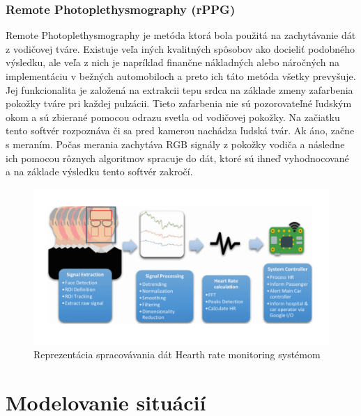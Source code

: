 \documentclass[10pt,oneside,slovak,a4paper]{article}
\begin{document}
\subsubsection{Remote Photoplethysmography (rPPG)} \label{predstavenie:heathr:rppg}
Remote Photoplethysmography je metóda ktorá bola použitá na zachytávanie dát z vodičovej tváre. Existuje veľa iných kvalitných spôsobov ako docieliť podobného výsledku, ale veľa z nich je napríklad finančne nákladných alebo náročných na implementáciu v bežných automobiloch a preto ich táto metóda všetky prevyšuje. Jej funkcionalita je založená na extrakcii tepu srdca na základe zmeny zafarbenia pokožky tváre pri každej pulzácii.\cite{hearth} Tieto zafarbenia nie sú pozorovateľné ľudským okom a sú zbierané pomocou odrazu svetla od vodičovej pokožky. Na začiatku tento softvér rozpoznáva či sa pred kamerou nachádza ľudská tvár. Ak áno, začne s meraním. Počas merania zachytáva RGB signály z pokožky vodiča a následne ich pomocou rôznych algoritmov spracuje do dát, ktoré sú ihneď vyhodnocované a na základe výsledku tento softvér zakročí.

\begin {figure} [H]
\includegraphics[scale=0.3]{hearth_rate_monitoring} 
\centering
\caption{Reprezentácia spracovávania dát Hearth rate monitoring systémom\cite{hearth}}
\label{fig1}
\end {figure}

\section{Modelovanie situácií} \label{modelovanie}
\end{document}

